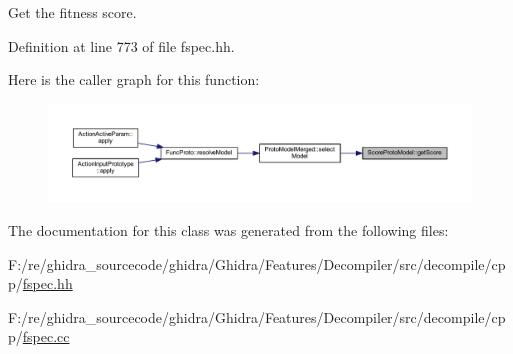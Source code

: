 Get the fitness score. 



Definition at line 773 of file fspec.\+hh.

Here is the caller graph for this function\+:
\nopagebreak
\begin{figure}[H]
\begin{center}
\leavevmode
\includegraphics[width=350pt]{class_score_proto_model_a3dec47bf8f824704151759848f50ddc7_icgraph}
\end{center}
\end{figure}


The documentation for this class was generated from the following files\+:\begin{DoxyCompactItemize}
\item 
F\+:/re/ghidra\+\_\+sourcecode/ghidra/\+Ghidra/\+Features/\+Decompiler/src/decompile/cpp/\mbox{\hyperlink{fspec_8hh}{fspec.\+hh}}\item 
F\+:/re/ghidra\+\_\+sourcecode/ghidra/\+Ghidra/\+Features/\+Decompiler/src/decompile/cpp/\mbox{\hyperlink{fspec_8cc}{fspec.\+cc}}\end{DoxyCompactItemize}
